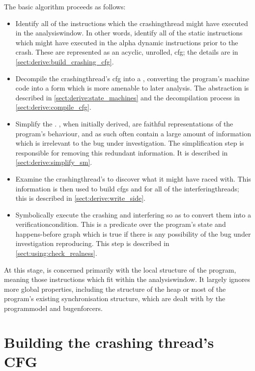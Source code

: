 The basic algorithm proceeds as follows:
\begin{itemize}
\item Identify all of the instructions which the \gls{crashingthread}
  might have executed in the \gls{analysiswindow}.  In other words,
  identify all of the static instructions which might have executed in
  the \gls{alpha} dynamic instructions prior to the crash.  These are
  represented as an acyclic, unrolled, \gls{cfg}; the details are in
  \autoref{sect:derive:build_crashing_cfg}.
\item Decompile the \gls{crashingthread}'s \gls{cfg} into a
  {\StateMachine}, converting the program's machine code into a form
  which is more amenable to later analysis.  The {\StateMachine}
  abstraction is described in \autoref{sect:derive:state_machines} and
  the decompilation process in \autoref{sect:derive:compile_cfg}.
\item Simplify the {\StateMachine}.  {\STateMachines}, when initially
  derived, are faithful representations of the program's behaviour,
  and as such often contain a large amount of information which is
  irrelevant to the bug under investigation.  The simplification step
  is responsible for removing this redundant information.  It is
  described in \autoref{sect:derive:simplify_sm}.
\item Examine the \gls{crashingthread}'s {\StateMachine} to discover
  what it might have raced with.  This information is then used to
  build \glspl{cfg} and {\StateMachines} for all of the
  \glspl{interferingthread}; this is described in
  \autoref{sect:derive:write_side}.
\item Symbolically execute the crashing and interfering
  {\StateMachines} so as to convert them into a
  \gls{verificationcondition}.  This is a predicate over the program's
  state and happens-before graph which is true if there is any
  possibility of the bug under investigation reproducing.  This step
  is described in \autoref{sect:using:check_realness}.
\end{itemize}
At this stage, {\technique} is concerned primarily with the local
structure of the program, meaning those instructions which fit within
the \gls{analysiswindow}.  It largely ignores more global properties,
including the structure of the heap or most of the program's existing
synchronisation structure, which are dealt with by the
\gls{programmodel} and \glspl{bugenforcer}.

\section{Building the crashing thread's CFG}
\label{sect:derive:build_crashing_cfg}

